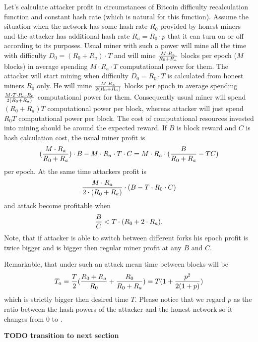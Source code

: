 \documentclass[number,preprint,review]{elsarticle}
\def\infinity{\rotatebox{90}{8}}
\begin{document}
Let's calculate attacker profit in circumstances of Bitcoin difficulty recalculation function and constant hash rate (which is natural for this function).
Assume the situation when the network has some hash rate \(R_0\) provided by honest miners and the attacker has additional hash rate \(R_a=R_0\cdot p\) that it can turn on or off according to its purposes.
Usual miner with such a power will mine all the time with difficulty \(D_0=(R_0+R_a)\cdot T\) and will mine \(M\cdot R_a\over R_0+R_a\) blocks per epoch (\(M\) blocks) in average spending \(M\cdot R_a\cdot T\) computational power for them.
The attacker will start mining when difficulty \(D_0=R_0\cdot T\) is calculated from honest miners \(R_0\) only.
He will mine \(M\cdot R_a\over 2(R_0+R_a)\) blocks per epoch in average spending \(M\cdot T\cdot R_a\cdot R_0\over 2(R_0+R_a)\) computational power for them.
Consequently usual miner will spend \((R_0+R_a)T\) computational power per block, whereas attacker will just spend \(R_0T\) computational power per block.
The cost of computational resources invested into mining should be around the expected reward.
If \(B\) is block reward and \(C\) is hash calculation cost, the usual miner profit is
\begin{equation}
{({M\cdot R_a\over R_0+R_a})\cdot B-M\cdot R_a\cdot T\cdot C=M\cdot R_a\cdot ({B\over R_0+R_a}-TC)}
\end{equation}
per epoch.
At the same time attackers profit is
\begin{equation}
{{M\cdot R_a \over 2\cdot (R_0+R_a)}\cdot (B - T\cdot R_0\cdot C)}
\end{equation}
and attack become profitable when
\begin{equation}
{{B\over C} < T\cdot (R_0+2\cdot R_a)}.
\end{equation}
Note, that if attacker is able to switch between different forks his epoch profit is twice bigger and is bigger then regular miner profit at any \(B\) and \(C\).


Remarkable, that under such an attack mean time between blocks will be
\begin{equation}
\label{eq:ati}
{T_a={T\over 2}({R_0+R_a\over R_0} + {R_0\over R_0+R_a})=T(1 + {p^2\over 2(1+p)})}
\end{equation}
which is strictly bigger then desired time \(T\).
Please notice that we regard \(p\) as the ratio between the hash-powers of the attacker and the honest network so it changes from 0 to \infinity.

\textbf{TODO transition to next section}
\end{document}
